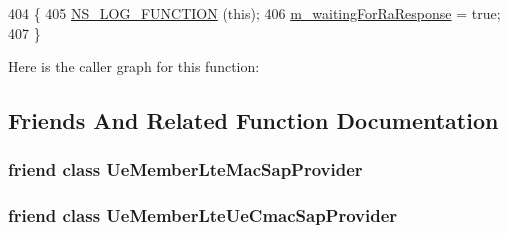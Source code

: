 \begin{DoxyCode}
404 \{
405    \hyperlink{log-macros-disabled_8h_a90b90d5bad1f39cb1b64923ea94c0761}{NS\_LOG\_FUNCTION} (\textcolor{keyword}{this});
406    \hyperlink{classns3_1_1LteUeMac_ad31e6d5654f49c13d6f5614922e97288}{m\_waitingForRaResponse} = \textcolor{keyword}{true};
407 \}
\end{DoxyCode}


Here is the caller graph for this function\+:




\subsection{Friends And Related Function Documentation}
\subsubsection[{\texorpdfstring{Ue\+Member\+Lte\+Mac\+Sap\+Provider}{UeMemberLteMacSapProvider}}]{\setlength{\rightskip}{0pt plus 5cm}friend class {\bf Ue\+Member\+Lte\+Mac\+Sap\+Provider}\hspace{0.3cm}{\ttfamily [friend]}}\hypertarget{classns3_1_1LteUeMac_adba87581e10f8546f83131ba7accea69}{}\label{classns3_1_1LteUeMac_adba87581e10f8546f83131ba7accea69}
\subsubsection[{\texorpdfstring{Ue\+Member\+Lte\+Ue\+Cmac\+Sap\+Provider}{UeMemberLteUeCmacSapProvider}}]{\setlength{\rightskip}{0pt plus 5cm}friend class {\bf Ue\+Member\+Lte\+Ue\+Cmac\+Sap\+Provider}\hspace{0.3cm}{\ttfamily [friend]}}\hypertarget{classns3_1_1LteUeMac_a89a2229e9fb66ebf25431c77f6c3281b}{}\label{classns3_1_1LteUeMac_a89a2229e9fb66ebf25431c77f6c3281b}

